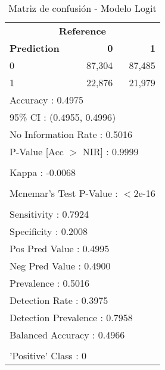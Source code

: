 \begin{table}[htbp]
\centering
\caption{Matriz de confusión - Modelo Logit}
\label{tab:confusion-logit}
\begin{tabular}{lrr}
\toprule
\multicolumn{3}{c}{\textbf{Reference}} \\
\textbf{Prediction} & \textbf{0} & \textbf{1} \\
\midrule
0 & 87,304 & 87,485 \\
1 & 22,876 & 21,979 \\
\midrule
\multicolumn{3}{l}{Accuracy : 0.4975} \\
\multicolumn{3}{l}{95\% CI : (0.4955, 0.4996)} \\
\multicolumn{3}{l}{No Information Rate : 0.5016} \\
\multicolumn{3}{l}{P-Value [Acc $>$ NIR] : 0.9999} \\
\\
\multicolumn{3}{l}{Kappa : -0.0068} \\
\\
\multicolumn{3}{l}{Mcnemar's Test P-Value : $<$2e-16} \\
\\
\multicolumn{3}{l}{Sensitivity : 0.7924} \\
\multicolumn{3}{l}{Specificity : 0.2008} \\
\multicolumn{3}{l}{Pos Pred Value : 0.4995} \\
\multicolumn{3}{l}{Neg Pred Value : 0.4900} \\
\multicolumn{3}{l}{Prevalence : 0.5016} \\
\multicolumn{3}{l}{Detection Rate : 0.3975} \\
\multicolumn{3}{l}{Detection Prevalence : 0.7958} \\
\multicolumn{3}{l}{Balanced Accuracy : 0.4966} \\
\\
\multicolumn{3}{l}{'Positive' Class : 0} \\
\bottomrule
\end{tabular}
\end{table}
